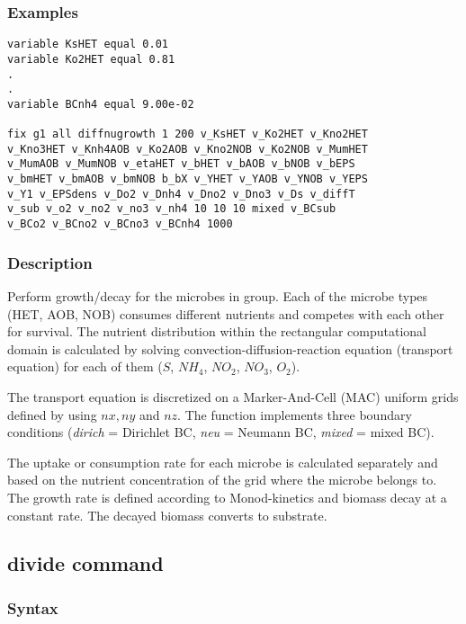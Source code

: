 \documentclass[11pt,a4paper,openright]{article}
\begin{document}
\subsubsection*{Examples}

\begin{Verbatim}[frame=single]
variable KsHET equal 0.01
variable Ko2HET equal 0.81
.
.
variable BCnh4 equal 9.00e-02

fix g1 all diffnugrowth 1 200 v_KsHET v_Ko2HET v_Kno2HET
v_Kno3HET v_Knh4AOB v_Ko2AOB v_Kno2NOB v_Ko2NOB v_MumHET
v_MumAOB v_MumNOB v_etaHET v_bHET v_bAOB v_bNOB v_bEPS
v_bmHET v_bmAOB v_bmNOB b_bX v_YHET v_YAOB v_YNOB v_YEPS
v_Y1 v_EPSdens v_Do2 v_Dnh4 v_Dno2 v_Dno3 v_Ds v_diffT
v_sub v_o2 v_no2 v_no3 v_nh4 10 10 10 mixed v_BCsub
v_BCo2 v_BCno2 v_BCno3 v_BCnh4 1000
\end{Verbatim}

\subsubsection*{Description}

Perform growth/decay for the microbes in group. Each of the microbe types (HET, AOB, NOB) consumes different nutrients and competes with each other for survival. The nutrient distribution within the rectangular computational domain is calculated by solving convection-diffusion-reaction equation (transport equation) for each of them ($S$, $NH_4$, $NO_2$, $NO_3$, $O_2$). 

The transport equation is discretized on a Marker-And-Cell (MAC) uniform grids defined by using $nx, ny$ and $nz$. 
The function implements three boundary conditions ({\it dirich} = Dirichlet BC, {\it neu} = Neumann BC, {\it mixed} = mixed BC). 

The uptake or consumption rate for each microbe is calculated separately and based on the nutrient concentration of the grid where the microbe belongs to.
The growth rate is defined according to Monod-kinetics and biomass decay at a constant rate. The decayed biomass converts to substrate. 

\subsection{divide command}

\subsubsection*{Syntax}
\end{document}
